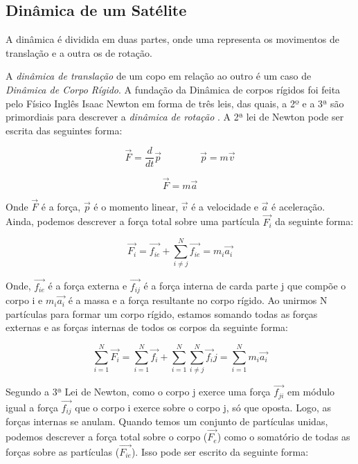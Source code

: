 
\subsection{Dinâmica de um Satélite}\label{cap:dinamica}

A dinâmica é dividida em duas partes, onde uma representa os movimentos de translação e a outra os de rotação.

A \textit{dinâmica de translação} de um copo em relação ao outro é um caso de \textit{Dinâmica de Corpo Rígido}. A fundação da Dinâmica de corpos rígidos foi feita pelo Físico Inglês Isaac Newton em forma de três leis, das quais, a 2º e a 3ª são primordiais para descrever a \textit{dinâmica de rotação} \cite{Snider}. A 2ª lei de Newton pode ser escrita das seguintes forma:

\begin{equation}\label{eq:fma}
  \vec{F}=\frac{d}{dt}\vec{p}\quad\quad\quad\quad\vec{p}=m\vec{v}
\end{equation}

\begin{equation}
  \vec{F}=m\vec{a}
\end{equation}

Onde $\vec{F}$ é a força, $\vec{p}$ é o momento linear, $\vec{v}$ é a velocidade e $\vec{a}$ é  aceleração. Ainda, podemos descrever a força total sobre uma partícula $\vec{F_i}$ da seguinte forma:

\begin{equation}\label{eq:Fi}
\vec{F_i}=\vec{f_{ie}}+\sum_{i\neq j}^{N}{\vec{f_{ie}}} = m_i\vec{a_i}
\end{equation}
 
 Onde, $\vec{f_{ie}}$ é a força externa e $\vec{f_{ij}}$ é a força interna de carda parte j que compõe o corpo i e $m_i\vec{a_i}$ é a massa e a força resultante no corpo rígido. Ao unirmos N partículas para formar um corpo rígido, estamos somando todas as forças externas e as forças internas de todos os corpos da seguinte forma:

\begin{equation}
  \sum_{i=1}^{N}{\vec{F_i}}=\sum_{i=1}^{N}{\vec{f_i}}+\sum_{i=1}^{N}{\sum_{i\neq j}^{N}{\vec{f_i}j=}}\sum_{i=1}^{N}{m_i\vec{a_i}} 
\end{equation}

Segundo a 3ª Lei de Newton, como o corpo j exerce uma força $\vec{f_{ji}}$ em módulo igual a força $\vec{f_{ij}}$ que o corpo i exerce sobre o corpo j, só que oposta. Logo, as forças internas se anulam. Quando temos um conjunto de partículas unidas, podemos descrever a força total sobre o corpo ($\vec{F_e}$) como o somatório de todas as forças sobre as partículas ($\vec{F_{ie}}$). Isso pode ser escrito da seguinte forma:

